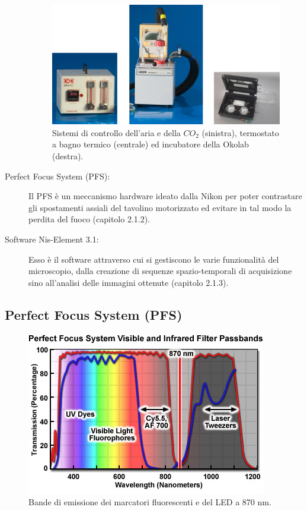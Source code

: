 \begin{description}
\begin{figure}
 \centering
 \includegraphics[scale=.40]{img/CAP2controllo.png}
 \caption{\small{Sistemi di controllo dell'aria e della $CO_2$ (sinistra), termostato a bagno termico (centrale) ed incubatore della Okolab (destra).}}
 \label{fig:controllo}
\end{figure}

\item[Perfect Focus System (PFS):]
Il PFS è un meccanismo hardware ideato dalla Nikon per poter contrastare gli spostamenti assiali del tavolino motorizzato ed evitare in tal modo la perdita del fuoco (capitolo 2.1.2).

\item[Software Nis-Element 3.1:]
Esso è il software attraverso cui si gestiscono le varie funzionalità del microscopio, dalla creazione di sequenze spazio-temporali di acquisizione sino all'analisi delle immagini ottenute (capitolo 2.1.3).

\end{description}


\subsection{Perfect Focus System (PFS)}\label{PFS}

\begin{figure}
 \centering
 \includegraphics[scale=.65]{img/CAP2bande.png}
 \caption{\small{Bande di emissione dei marcatori fluorescenti e del LED a 870 nm.}}
 \label{fig:bande}
\end{figure}

